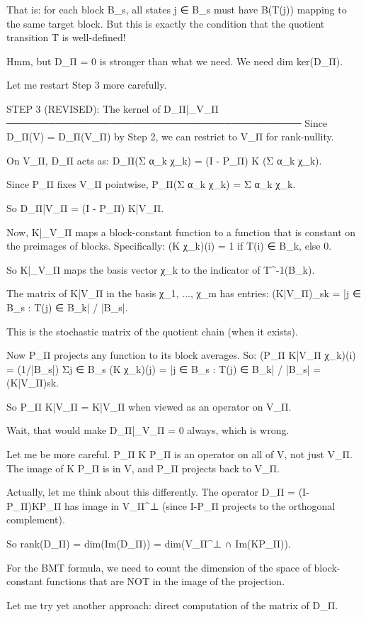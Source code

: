 That is: for each block B_s, all states j ∈ B_s must have B(T(j)) mapping
to the same target block. But this is exactly the condition that the
quotient transition T̄ is well-defined!

Hmm, but D_Π = 0 is stronger than what we need. We need dim ker(D_Π).

Let me restart Step 3 more carefully.

STEP 3 (REVISED): The kernel of D_Π|_{V_Π}
──────────────────────────────────────────
Since D_Π(V) = D_Π(V_Π) by Step 2, we can restrict to V_Π for rank-nullity.

On V_Π, D_Π acts as:
D_Π(Σ α_k χ_k) = (I - P_Π) K (Σ α_k χ_k).

Since P_Π fixes V_Π pointwise, P_Π(Σ α_k χ_k) = Σ α_k χ_k.

So D_Π|{V_Π} = (I - P_Π) K|{V_Π}.

Now, K|_{V_Π} maps a block-constant function to a function that is
constant on the preimages of blocks. Specifically:
(K χ_k)(i) = 1 if T(i) ∈ B_k, else 0.

So K|_{V_Π} maps the basis vector χ_k to the indicator of T^{-1}(B_k).

The matrix of K|{V_Π} in the basis {χ_1, ..., χ_m} has entries:
(K|{V_Π})_{sk} = |{j ∈ B_s : T(j) ∈ B_k}| / |B_s|.

This is the stochastic matrix of the quotient chain (when it exists).

Now P_Π projects any function to its block averages. So:
(P_Π K|{V_Π} χ_k)(i) = (1/|B_s|) Σ{j ∈ B_s} (K χ_k)(j)
= |{j ∈ B_s : T(j) ∈ B_k}| / |B_s|
= (K|{V_Π}){sk}.

So P_Π K|{V_Π} = K|{V_Π} when viewed as an operator on V_Π.

Wait, that would make D_Π|_{V_Π} = 0 always, which is wrong.

Let me be more careful. P_Π K P_Π is an operator on all of V, not just V_Π.
The image of K P_Π is in V, and P_Π projects back to V_Π.

Actually, let me think about this differently. The operator D_Π = (I-P_Π)KP_Π
has image in V_Π^⊥ (since I-P_Π projects to the orthogonal complement).

So rank(D_Π) = dim(Im(D_Π)) = dim(V_Π^⊥ ∩ Im(KP_Π)).

For the BMT formula, we need to count the dimension of the space of
block-constant functions that are NOT in the image of the projection.

Let me try yet another approach: direct computation of the matrix of D_Π.

